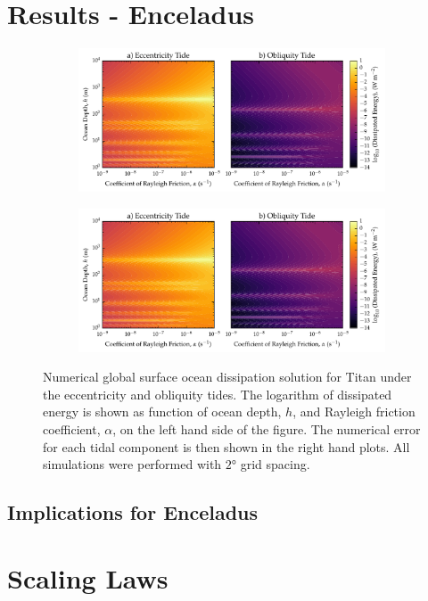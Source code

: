 \section{Results - Enceladus \label{sec:results_Enceladus}}

\begin{figure}[!t]
    \centering
    \begin{subfigure}[t]{0.9\linewidth} %
        \includegraphics[width=\linewidth]{Figures/enceladus_linear}
        \label{fig:lincEccEncel}
    \end{subfigure}
    \begin{subfigure}[t]{0\linewidth} %
         \includegraphics[width=\linewidth]{Figures/enceladus_linear}
         \label{fig:linObliqEncel} 
    \end{subfigure}
    \vspace{-0.5cm}
\caption{Numerical global surface ocean dissipation solution for Titan under the eccentricity and obliquity tides. The logarithm of dissipated energy is shown as function of ocean depth, $h$, and Rayleigh friction coefficient, $\alpha$, on the left hand side of the figure. The numerical error for each tidal component is then shown in the right hand plots. All simulations were performed with $\ang{2}$ grid spacing. \label{fig:linEncel}}
\end{figure}

\subsection{Implications for Enceladus}

\section{Scaling Laws \label{subsec:scaling}}